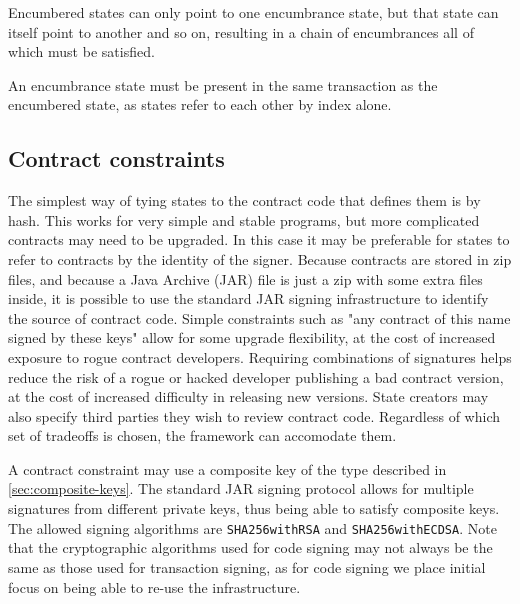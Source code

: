 \documentclass{article}
\begin{document}
Encumbered states can only point to one encumbrance state, but that state can itself point to another and so on,
resulting in a chain of encumbrances all of which must be satisfied.


An encumbrance state must be present in the same transaction as the encumbered state, as states refer to each other
by index alone.


\subsection{Contract constraints}\label{sec:contract-constraints}

The simplest way of tying states to the contract code that defines them is by hash. This works for very simple
and stable programs, but more complicated contracts may need to be upgraded. In this case it may be preferable
for states to refer to contracts by the identity of the signer. Because contracts are stored in zip files, and
because a Java Archive (JAR) file is just a zip with some extra files inside, it is possible to use the standard
JAR signing infrastructure to identify the source of contract code. Simple constraints such as "any contract of
this name signed by these keys" allow for some upgrade flexibility, at the cost of increased exposure to rogue
contract developers. Requiring combinations of signatures helps reduce the risk of a rogue or hacked developer
publishing a bad contract version, at the cost of increased difficulty in releasing new versions. State creators
may also specify third parties they wish to review contract code. Regardless of which set of tradeoffs is chosen,
the framework can accomodate them.

A contract constraint may use a composite key of the type described in \cref{sec:composite-keys}. The standard JAR
signing protocol allows for multiple signatures from different private keys, thus being able to satisfy composite
keys. The allowed signing algorithms are \texttt{SHA256withRSA} and \texttt{SHA256withECDSA}. Note that the
cryptographic algorithms used for code signing may not always be the same as those used for transaction signing,
as for code signing we place initial focus on being able to re-use the infrastructure.

\end{document}
